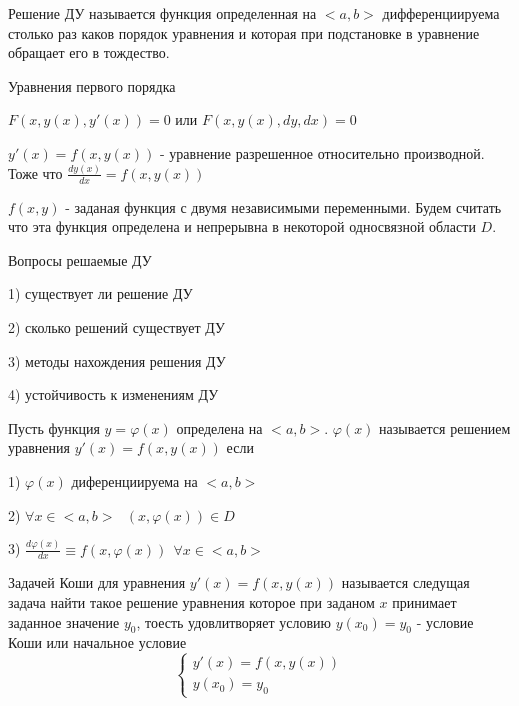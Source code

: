 \begin{define}[решения ДУ]
  Решение ДУ называется функция определенная на $<a,b>$ дифференциируема столько
  раз каков порядок уравнения и которая при подстановке в уравнение обращает его
  в тождество.
\end{define}

\begin{title}
  Уравнения первого порядка
\end{title}

$F(x, y(x), y'(x)) = 0$ или $F(x, y(x), dy, dx) = 0$

$y'(x) = f(x, y(x))$ - уравнение разрешенное относительно производной. Тоже что
$\frac{dy(x)}{dx} = f(x, y(x))$

$f(x, y)$ - заданая функция с двумя независимыми переменными. Будем считать что
эта функция определена и непрерывна в некоторой односвязной области $D$.

\begin{center}
  Вопросы решаемые ДУ
\end{center}

1) существует ли решение ДУ

2) сколько решений существует ДУ

3) методы нахождения решения ДУ

4) устойчивость к изменениям ДУ

\begin{define}[решения ДУ]
  Пусть функция $y = \varphi (x)$ определена на $<a,b>$. $\varphi (x)$
  называется решением уравнения $y'(x) = f(x, y(x))$ если

  1) $\varphi (x)$ диференциируема на $<a,b>$

  2) $\forall x \in <a,b> ~~~ (x, \varphi(x)) \in D$

  3) $\frac{d\varphi (x)}{dx} \equiv f(x, \varphi(x)) ~~ \forall x \in <a,b>$
\end{define}

\begin{define}
  Задачей Коши для уравнения $y'(x) = f(x, y(x))$ называется следущая задача
  найти такое решение уравнения которое при заданом $x$ принимает
  заданное значение $y_0$, тоесть удовлитворяет условию $y(x_0) = y_0$
  - условие Коши или начальное условие
  $$
  \left\{
  \begin{array}{l}
    y'(x) = f(x, y(x)) \\
    y(x_0) = y_0
  \end{array}
  \right.
  $$
\end{define}

